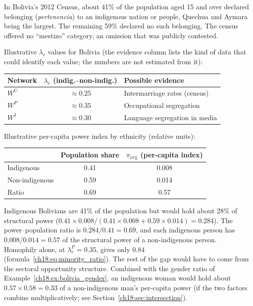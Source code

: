 \documentclass[../structural_economics_book.tex]{subfiles}
\begin{document}
\begin{example}\label{ch18:ex:bolivia_ethnic}
In Bolivia's 2012 Census, about 41\% of the population aged 15 and over declared belonging (\textit{pertenencia}) to an indigenous nation or people, Quechua and Aymara being the largest. The remaining 59\% declared no such belonging. The census offered no ``mestizo'' category, an omission that was publicly contested. %

Illustrative $\lambda_r$ values for Bolivia (the evidence column lists the kind of data that could identify each value; the numbers are not estimated from it):
\begin{center}
\begin{tabular}{lcl}
\toprule
Network & $\lambda_r$ (indig.--non-indig.) & Possible evidence \\
\midrule
$W^U$ & $\approx 0.25$ & Intermarriage rates (census) \\
$W^P$ & $\approx 0.35$ & Occupational segregation \\
$W^I$ & $\approx 0.30$ & Language segregation in media \\
\bottomrule
\end{tabular}
\end{center}

Illustrative per-capita power index by ethnicity (relative units):
\begin{center}
\begin{tabular}{lcc}
\toprule
& Population share & $\pi_{\text{avg}}$ (per-capita index) \\
\midrule
Indigenous & 0.41 & 0.008 \\
Non-indigenous & 0.59 & 0.014 \\
Ratio & 0.69 & 0.57 \\
\bottomrule
\end{tabular}
\end{center}

Indigenous Bolivians are 41\% of the population but would hold about 28\% of structural power ($0.41 \times 0.008 / (0.41 \times 0.008 + 0.59 \times 0.014) = 0.284$). The power--population ratio is $0.284/0.41 = 0.69$, and each indigenous person has $0.008/0.014 = 0.57$ of the structural power of a non-indigenous person. Homophily alone, at $\lambda_r^P = 0.35$, gives only $0.84$ (formula~\eqref{ch18:eq:minority_ratio}). The rest of the gap would have to come from the sectoral opportunity structure. Combined with the gender ratio of Example~\ref{ch18:ex:bolivia_gender}, an indigenous woman would hold about $0.57 \times 0.58 = 0.33$ of a non-indigenous man's per-capita power (if the two factors combine multiplicatively; see Section~\ref{ch18:sec:intersection}).
\end{example}
\end{document}
